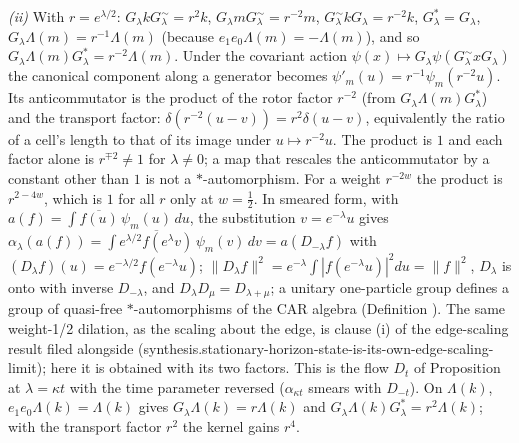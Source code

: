 \emph{(ii)} With $r = e^{\lambda/2}$: $G_{\lambda}kG_{\lambda}^{\sim} = r^{2}k$, $G_{\lambda}mG_{\lambda}^{\sim} = r^{-2}m$, $G_{\lambda}^{\sim}kG_{\lambda} = r^{-2}k$, $G_{\lambda}^{*} = G_{\lambda}$, $G_{\lambda}\Lambda(m) = r^{-1}\Lambda(m)$ (because $e_{1}e_{0}\Lambda(m) = -\Lambda(m)$), and so $G_{\lambda}\Lambda(m)G_{\lambda}^{*} = r^{-2}\Lambda(m)$. Under the covariant action $\psi(x) \mapsto G_{\lambda}\psi(G_{\lambda}^{\sim}xG_{\lambda})$ the canonical component along a generator becomes $\psi'_{m}(u) = r^{-1}\psi_{m}(r^{-2}u)$. Its anticommutator is the product of the rotor factor $r^{-2}$ (from $G_{\lambda}\Lambda(m)G_{\lambda}^{*}$) and the transport factor: $\delta(r^{-2}(u - v)) = r^{2}\delta(u - v)$, equivalently the ratio of a cell's length to that of its image under $u \mapsto r^{-2}u$. The product is $1$ and each factor alone is $r^{\mp 2} \neq 1$ for $\lambda \neq 0$; a map that rescales the anticommutator by a constant other than $1$ is not a $*$-automorphism. For a weight $r^{-2w}$ the product is $r^{2 - 4w}$, which is $1$ for all $r$ only at $w = \tfrac12$. In smeared form, with $a(f) = \int\overline{f(u)}\,\psi_{m}(u)\,du$, the substitution $v = e^{-\lambda}u$ gives $\alpha_{\lambda}(a(f)) = \int\overline{e^{\lambda/2}f(e^{\lambda}v)}\,\psi_{m}(v)\,dv = a(D_{-\lambda}f)$ with $(D_{\lambda}f)(u) = e^{-\lambda/2}f(e^{-\lambda}u)$; $\|D_{\lambda}f\|^{2} = e^{-\lambda}\int|f(e^{-\lambda}u)|^{2}du = \|f\|^{2}$, $D_{\lambda}$ is onto with inverse $D_{-\lambda}$, and $D_{\lambda}D_{\mu} = D_{\lambda + \mu}$; a unitary one-particle group defines a group of quasi-free $*$-automorphisms of the CAR algebra (Definition ). The same weight-1/2 dilation, as the scaling about the edge, is clause (i) of the edge-scaling result filed alongside (synthesis.stationary-horizon-state-is-its-own-edge-scaling-limit); here it is obtained with its two factors. This is the flow $D_{t}$ of Proposition  at $\lambda = \kappa t$ with the time parameter reversed ($\alpha_{\kappa t}$ smears with $D_{-t}$). On $\Lambda(k)$, $e_{1}e_{0}\Lambda(k) = \Lambda(k)$ gives $G_{\lambda}\Lambda(k) = r\Lambda(k)$ and $G_{\lambda}\Lambda(k)G_{\lambda}^{*} = r^{2}\Lambda(k)$; with the transport factor $r^{2}$ the kernel gains $r^{4}$.

